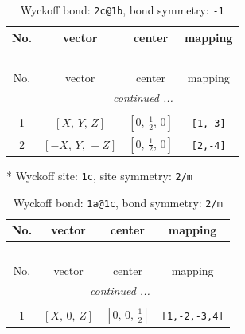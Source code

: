\documentclass[fleqn,8pt]{jsarticle}
\begin{document}
\renewcommand{\arraystretch}{1.2}
\begin{longtable}{cccc}
\caption{Wyckoff bond: {\tt 2c@1b}, bond symmetry: {\tt -1}}
 \\
 \hline \hline
No. & vector & center & mapping \\ \hline \endfirsthead

\multicolumn{3}{l}{\tablename\ \thetable{}} \\
 \hline \hline
No. & vector & center & mapping \\ \hline \endhead

 \hline \hline
\multicolumn{3}{r}{\footnotesize\it continued ...} \\ \endfoot

 \hline \hline
\multicolumn{3}{r}{} \\ \endlastfoot

1 & $\left[ X,\, Y,\, Z \right]$ & $\left[ 0,\, \frac{1}{2},\, 0 \right]$ & {\tt [1,-3]} \\ \hline
2 & $\left[ - X,\, Y,\, - Z \right]$ & $\left[ 0,\, \frac{1}{2},\, 0 \right]$ & {\tt [2,-4]} \\
\end{longtable}
* Wyckoff site: {\tt 1c}, site symmetry: {\tt 2/m}
\renewcommand{\arraystretch}{1.2}
\begin{longtable}{cccc}
\caption{Wyckoff bond: {\tt 1a@1c}, bond symmetry: {\tt 2/m}}
 \\
 \hline \hline
No. & vector & center & mapping \\ \hline \endfirsthead

\multicolumn{3}{l}{\tablename\ \thetable{}} \\
 \hline \hline
No. & vector & center & mapping \\ \hline \endhead

 \hline \hline
\multicolumn{3}{r}{\footnotesize\it continued ...} \\ \endfoot

 \hline \hline
\multicolumn{3}{r}{} \\ \endlastfoot

1 & $\left[ X,\, 0,\, Z \right]$ & $\left[ 0,\, 0,\, \frac{1}{2} \right]$ & {\tt [1,-2,-3,4]} \\
\end{longtable}
\renewcommand{\arraystretch}{1.2}
\end{document}
